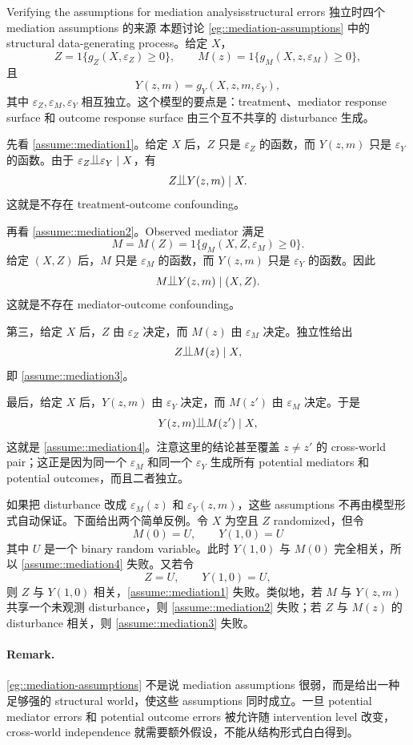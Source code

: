 \begin{exercisesolution}{Verifying the assumptions for mediation analysis}{structural errors 独立时四个 mediation assumptions 的来源}
本题讨论 \cref{eg::mediation-assumptions} 中的 structural data-generating process。给定 $X$，
\[
Z=1\{g_Z(X,\varepsilon_Z)\geq 0\},\qquad
M(z)=1\{g_M(X,z,\varepsilon_M)\geq 0\},
\]
且
\[
Y(z,m)=g_Y(X,z,m,\varepsilon_Y),
\]
其中 $\varepsilon_Z,\varepsilon_M,\varepsilon_Y$ 相互独立。这个模型的要点是：treatment、mediator response surface 和 outcome response surface 由三个互不共享的 disturbance 生成。

先看 \cref{assume::mediation1}。给定 $X$ 后，$Z$ 只是 $\varepsilon_Z$ 的函数，而 $Y(z,m)$ 只是 $\varepsilon_Y$ 的函数。由于 $\varepsilon_Z\ind\varepsilon_Y\mid X$，有
\[
Z\ind Y(z,m)\mid X.
\]
这就是不存在 treatment-outcome confounding。

再看 \cref{assume::mediation2}。Observed mediator 满足
\[
M=M(Z)=1\{g_M(X,Z,\varepsilon_M)\geq 0\}.
\]
给定 $(X,Z)$ 后，$M$ 只是 $\varepsilon_M$ 的函数，而 $Y(z,m)$ 只是 $\varepsilon_Y$ 的函数。因此
\[
M\ind Y(z,m)\mid (X,Z).
\]
这就是不存在 mediator-outcome confounding。

第三，给定 $X$ 后，$Z$ 由 $\varepsilon_Z$ 决定，而 $M(z)$ 由 $\varepsilon_M$ 决定。独立性给出
\[
Z\ind M(z)\mid X,
\]
即 \cref{assume::mediation3}。

最后，给定 $X$ 后，$Y(z,m)$ 由 $\varepsilon_Y$ 决定，而 $M(z')$ 由 $\varepsilon_M$ 决定。于是
\[
Y(z,m)\ind M(z')\mid X,
\]
这就是 \cref{assume::mediation4}。注意这里的结论甚至覆盖 $z\neq z'$ 的 cross-world pair；这正是因为同一个 $\varepsilon_M$ 和同一个 $\varepsilon_Y$ 生成所有 potential mediators 和 potential outcomes，而且二者独立。

如果把 disturbance 改成 $\varepsilon_M(z)$ 和 $\varepsilon_Y(z,m)$，这些 assumptions 不再由模型形式自动保证。下面给出两个简单反例。令 $X$ 为空且 $Z$ randomized，但令
\[
M(0)=U,\qquad Y(1,0)=U
\]
其中 $U$ 是一个 binary random variable。此时 $Y(1,0)$ 与 $M(0)$ 完全相关，所以 \cref{assume::mediation4} 失败。又若令
\[
Z=U,\qquad Y(1,0)=U,
\]
则 $Z$ 与 $Y(1,0)$ 相关，\cref{assume::mediation1} 失败。类似地，若 $M$ 与 $Y(z,m)$ 共享一个未观测 disturbance，则 \cref{assume::mediation2} 失败；若 $Z$ 与 $M(z)$ 的 disturbance 相关，则 \cref{assume::mediation3} 失败。

\paragraph{Remark.}
\cref{eg::mediation-assumptions} 不是说 mediation assumptions 很弱，而是给出一种足够强的 structural world，使这些 assumptions 同时成立。一旦 potential mediator errors 和 potential outcome errors 被允许随 intervention level 改变，cross-world independence 就需要额外假设，不能从结构形式白白得到。
\end{exercisesolution}

